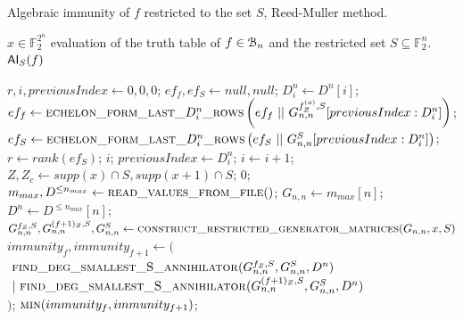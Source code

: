 \documentclass[11pt]{llncs}
\begin{document}
\begin{algorithm}[H]
\small
	\caption{Algebraic immunity of $f$ restricted to the set $S$, Reed-Muller method.}\label{alg:RMApproach}
	\begin{algorithmic}[1]
		\Require $x\in \mathbb{F}_2^{2^n}$ evaluation of the truth table of $f\in \mathcal{B}_{n}$ and the restricted set $S\subseteq \mathbb{F}_2^n$.
		\Ensure $\mathsf{AI}_S(f)$
		
		\State $r,i, previousIndex\gets 0,0,0$;
		\State $ef_f, ef_S \gets null, null$;
		\State $D_i^n \gets D^n[i]$;
		\State $ef_f\gets \mbox{\textsc{echelon\_form\_last\_}}D_i^n\mbox{\textsc{\_rows}}\left(ef_f\ ||\  G_{n,n}^{f_Z^{(o)},S}[previousIndex:D_i^n]\right)$\footnotemark;
		\State $ef_S \gets \mbox{\textsc{echelon\_form\_last\_}}D_i^n\mbox{\textsc{\_rows}}\left(ef_S\ ||\ G_{n,n}^S[previousIndex:D_i^n]\right)$;
		\State $r \gets rank\left(ef_S\right)$;
		\State
		\Return $i$;
		\EndIf
		\State $previousIndex \gets D_i^n$;
		\State $i \gets i+1$;
		\EndWhile
		\EndFunction
        \State
        \State $Z , Z_c\gets supp(x)\cap S, supp(x+1) \cap S$;
		\Return $0$;
		\EndIf
		\State $m_{max}, D^{\leq n_{max}}\gets \mbox{\textsc{read\_values\_from\_file}}()$;
		\State $G_{n,n}\gets m_{max}[n]$;
		\State $D^n \gets D^{\leq n_{max}}[n]$;
        \State $G_{n,n}^{f_Z,S}, G_{n,n}^{(f+ 1)_Z,S}, G_{n,n}^S \gets \textsc{construct\_restricted\_generator\_matrices}(G_{n,n},x,S)$\footnotemark\;
		\State $immunity_f, immunity_{f+1} \leftarrow ($\\
		$\ \mbox{\textsc{find\_deg\_smallest\_S\_annihilator}}(G_{n,n}^{f_Z,S}, G_{n,n}^S,D^{n})$\\
		$\ |\ \mbox{\textsc{find\_deg\_smallest\_S\_annihilator}}(G_{n,n}^{(f+ 1)_Z,S}, G_{n,n}^S, D^{n})$\\
		$)$;
		\State \Return $\mbox{\textsc{min}}(immunity_f, immunity_{f+1})$\footnotemark;
	\end{algorithmic}
\end{algorithm}
\end{document}
